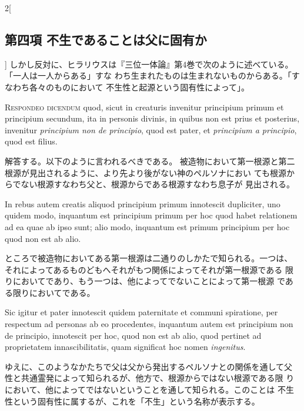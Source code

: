 \documentclass[paper=a4paper,fontsize=10pt,jafontsize=9pt,titlepage]{jlreq}
\begin{document}
\begin{paracol}{2}[\subsection{第四項 不生であることは父に固有か}]
しかし反対に、ヒラリウスは『三位一体論』第4巻で次のように述べている。「一人は一人からある」すな
 わち生まれたものは生まれないものからある。「すなわち各々のものにおいて
 不生性と起源という固有性によって」。




{\scshape Respondeo dicendum} quod, sicut in creaturis invenitur principium
primum et principium secundum, ita in personis divinis, in quibus non
est prius et posterius, invenitur {\itshape principium non de principio}, quod
est pater, et {\itshape principium a principio}, quod est filius.


\switchcolumn


解答する。以下のように言われるべきである。
被造物において第一根源と第二根源が見出されるように、より先より後がない神のペルソナにおい
 ても根源からでない根源すなわち父と、根源からである根源すなわち息子が
 見出される。


\switchcolumn*


In rebus autem
creatis aliquod principium primum innotescit dupliciter, uno quidem
modo, inquantum est principium primum per hoc quod habet relationem ad
ea quae ab ipso sunt; alio modo, inquantum est primum principium per
hoc quod non est ab alio.


\switchcolumn


ところで被造物においてある第一根源は二通りのしかたで知られる。一つは、
 それによってあるものどもへそれがもつ関係によってそれが第一根源である
 限りにおいてであり、もう一つは、他によってでないことによって第一根源
 である限りにおいてである。


\switchcolumn*


Sic igitur et pater innotescit quidem
paternitate et communi spiratione, per respectum ad personas ab eo
procedentes, inquantum autem est principium non de principio,
innotescit per hoc, quod non est ab alio, quod pertinet ad
proprietatem innascibilitatis, quam significat hoc nomen {\itshape ingenitus}.


\switchcolumn


ゆえに、このようなかたちで父は父から発出するペルソナとの関係を通して父
 性と共通霊発によって知られるが、他方で、根源からではない根源である限
 りにおいて、他によってではないということを通して知られる。このことは
 不生性という固有性に属するが、これを「不生」という名称が表示する。


\switchcolumn*[\subsection{ad.1}]



\end{paracol}
\end{document}
